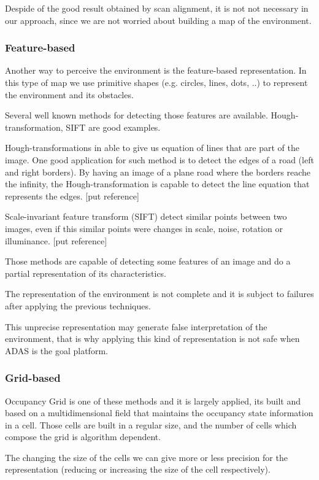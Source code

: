 Despide of the good result obtained by scan alignment, it is not not necessary in our approach, since we are not worried about building a map of the environment. 

\subsubsection{Feature-based}

Another way to perceive the environment is the feature-based representation. In this type of map we use primitive shapes (e.g. circles, lines, dots, ..) to represent the environment and its obstacles.

Several well known methods for detecting those features are available. Hough-transformation, SIFT are good examples. 

Hough-transformations in able to give us equation of lines that are part of the image. One good application for such method is to detect the edges of a road (left and right borders). By having an image of a plane road where the borders reache the infinity, the Hough-transformation is capable to detect the line equation that represents the edges. [put reference]

Scale-invariant feature transform (SIFT) detect similar points between two images, even if this similar points were changes in scale, noise, rotation or illuminance. [put reference] 

Those methods are capable of detecting some features of an image and do a partial representation of its characteristics. 

The representation of the environment is not complete and it is subject to failures after applying the previous techniques.

This unprecise representation may generate false interpretation of the environment, that is why applying this kind of representation is not safe when ADAS is the goal platform.

\subsubsection{Grid-based}

Occupancy Grid is one of these methods and it is largely applied, its built and based on a multidimensional field that maintains the occupancy state information in a cell\cite{Elfes:1989:UOG:68491.68495}. Those cells are built in a regular size, and the number of cells which compose the grid is algorithm dependent.

The changing the size of the cells we can give more or less precision for the representation (reducing or increasing the size of the cell respectively).

